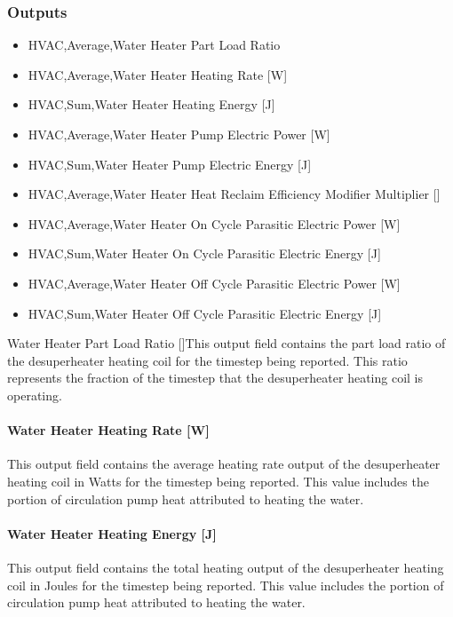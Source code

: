 \subsubsection{Outputs}\label{outputs-18}

\begin{itemize}
\item
  HVAC,Average,Water Heater Part Load Ratio
\item
  HVAC,Average,Water Heater Heating Rate {[}W{]}
\item
  HVAC,Sum,Water Heater Heating Energy {[}J{]}
\item
  HVAC,Average,Water Heater Pump Electric Power {[}W{]}
\item
  HVAC,Sum,Water Heater Pump Electric Energy {[}J{]}
\item
  HVAC,Average,Water Heater Heat Reclaim Efficiency Modifier Multiplier {[]}
\item
  HVAC,Average,Water Heater On Cycle Parasitic Electric Power {[}W{]}
\item
  HVAC,Sum,Water Heater On Cycle Parasitic Electric Energy {[}J{]}
\item
  HVAC,Average,Water Heater Off Cycle Parasitic Electric Power {[}W{]}
\item
  HVAC,Sum,Water Heater Off Cycle Parasitic Electric Energy {[}J{]}
\end{itemize}

Water Heater Part Load Ratio {[]}This output field contains the part load ratio of the desuperheater heating coil for the timestep being reported. This ratio represents the fraction of the timestep that the desuperheater heating coil is operating.

\paragraph{Water Heater Heating Rate {[}W{]}}\label{water-heater-heating-rate-w}

This output field contains the average heating rate output of the desuperheater heating coil in Watts for the timestep being reported. This value includes the portion of circulation pump heat attributed to heating the water.

\paragraph{Water Heater Heating Energy {[}J{]}}\label{water-heater-heating-energy-j}

This output field contains the total heating output of the desuperheater heating coil in Joules for the timestep being reported. This value includes the portion of circulation pump heat attributed to heating the water.

